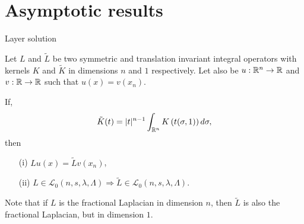 \section{Asymptotic results}
\label{Sec:Asymptotic}











Layer solution


\begin{proposition}
	\label{Prop:KernelsDimension}
	Let $L$ and $\tilde{L}$ be two symmetric and translation invariant integral operators with kernels $K$ and $\tilde{K}$ in dimensions $n$ and $1$ respectively. Let also be $u:\mathbb{R}^n\to\mathbb{R}$ and $v:\mathbb{R}\to\mathbb{R}$ such that $u(x) = v(x_n)$.
	
	If,
	$$ \tilde{K}(t) = |t|^{n-1} \int_{\mathbb{R}^n} K\left(t(\sigma,1)\right) d\sigma, $$
	then
	\begin{enumerate}
		\item[(i)] $Lu(x) = \tilde{L}v(x_n)$,
		\item[(ii)] $L\in \mathcal{L}_0 (n,s,\lambda,\Lambda) \Rightarrow \tilde{L}\in \mathcal{L}_0 (n,s,\lambda,\Lambda)$.
	\end{enumerate}
\end{proposition}

Note that if $L$ is the fractional Laplacian in dimension $n$, then $\tilde{L}$ is also the fractional Laplacian, but in dimension $1$.

